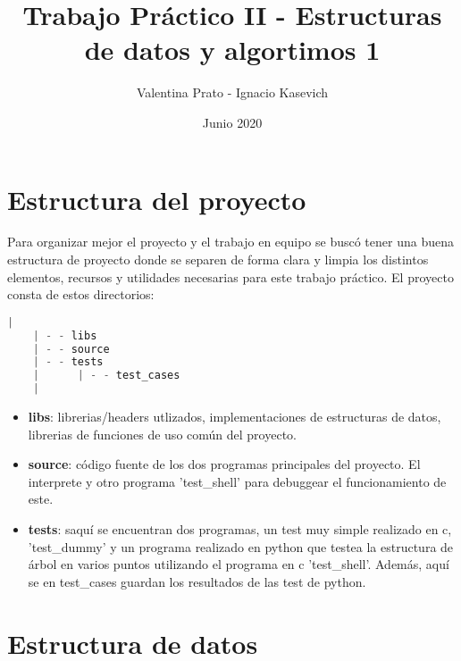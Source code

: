 \documentclass[a4paper, 12pt]{article}
\title{Trabajo Práctico II - Estructuras de datos y algortimos 1}
\author{Valentina Prato - Ignacio Kasevich }
\date{Junio 2020}
\begin{document}
\maketitle
\section{Estructura del proyecto}
	Para organizar mejor el proyecto y el trabajo en equipo se buscó tener una buena estructura de proyecto donde se separen de forma clara y limpia los distintos elementos, recursos y utilidades necesarias para este trabajo práctico. El proyecto consta de estos directorios:
	\begin{lstlisting}[language=C]
    |
    | - - libs
    | - - source               
    | - - tests
    |      | - - test_cases
    |
    \end{lstlisting}
    
\begin{itemize}
\item \textbf{libs}: librerias/headers utlizados, implementaciones de estructuras de datos, librerias de funciones de uso común del proyecto.
\item \textbf{source}: código fuente de los dos programas principales del proyecto. El interprete y otro programa 'test\_shell' para debuggear el funcionamiento de este.
\item  \textbf{tests}: saquí se encuentran dos programas, un test muy simple realizado en c, 'test\_dummy' y un programa realizado en python que testea la estructura de árbol en varios puntos utilizando el programa en c 'test\_shell'. Además, aquí se en test\_cases guardan los resultados de las test de python.
\end{itemize}

\section{Estructura de datos}
\end{document}
